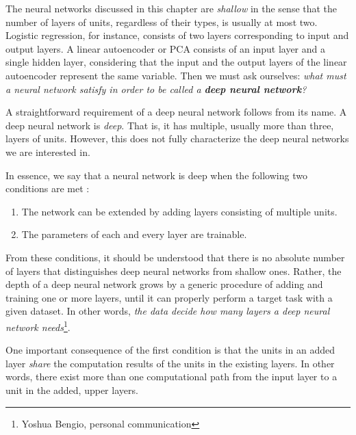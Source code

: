 \documentclass[dissertation,nocontribution,draft*]{aaltoseries}
\begin{document}
The neural networks discussed in this chapter are
\textit{shallow} in the sense that the number of layers of
units, regardless of their types, is usually at most two.
Logistic regression, for instance, consists of two layers
corresponding to input and output layers. A linear
autoencoder or PCA consists of an input layer and a single
hidden layer, considering that the input and the output
layers of the linear autoencoder represent the same
variable. Then we must ask ourselves: \textit{what must a
neural network satisfy in order to be called a \textbf{deep
neural network}?}

A straightforward requirement of a deep neural network
follows from its name. A deep neural network is
\textit{deep}. That is, it has
multiple, usually more than three, layers of units.
However, this does not fully characterize the deep neural
networks we are interested in.

In essence, we say that a neural network is deep 
when the following two conditions are met \citep[see, e.g.,][]{Bengio2007a}:
\begin{enumerate}
    \itemsep 0em
    \item The network can be extended by adding layers consisting of multiple units.
    \item The parameters of each and every layer are trainable.
\end{enumerate}

From these conditions, it should be understood that there is
no absolute number of layers that distinguishes deep neural
networks from shallow ones. Rather, the depth of a deep
neural network grows by a generic procedure of adding and
training one
or more layers, until it can properly perform a
target task with a given dataset. In other words,
\textit{the data decide how many layers a deep neural network
needs}\footnote{Yoshua Bengio, personal communication}. 

One important consequence of the first condition is that the
units in an added layer \textit{share} the computation
results of the units in the existing layers. In other words,
there exist more than one computational path from the input
layer to a unit in the added, upper layers.



\end{document}

